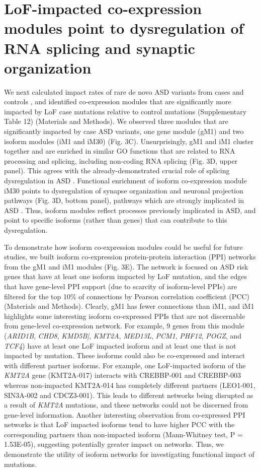 \documentclass[12pt,chapterheads,final]{ucsd}
\begin{document}
\section{LoF-impacted co-expression modules point to dysregulation of RNA splicing and synaptic organization}
We next calculated impact rates of rare de novo ASD variants from cases and controls \cite{Satterstrom2019}, and identified co-expression modules that are significantly more impacted by LoF case mutations relative to control mutations (Supplementary Table 12) (Materials and Methods). We observed three modules that are significantly impacted by case ASD variants, one gene module (gM1) and two isoform modules (iM1 and iM30) (Fig. 3C). Unsurprisingly, gM1 and iM1 cluster together and are enriched in similar GO functions that are related to RNA processing and splicing, including non-coding RNA splicing (Fig. 3D, upper panel). This agrees with the already-demonstrated crucial role of splicing dysregulation in ASD \cite{Parikshak2016,Gandal2018}. Functional enrichment of isoform co-expression module iM30 points to dysregulation of synapse organization and neuronal projection pathways (Fig. 3D, bottom panel), pathways which are strongly implicated in ASD \cite{Pinto2014,Iakoucheva2019}. Thus, isoform modules reflect processes previously implicated in ASD, and point to specific isoforms (rather than genes) that can contribute to this dysregulation. \par
To demonstrate how isoform co-expression modules could be useful for future studies, we built isoform co-expression protein-protein interaction (PPI) networks from the gM1 and iM1 modules (Fig. 3E). The network is focused on ASD risk genes that have at least one isoform impacted by LoF mutation, and the edges that have gene-level PPI support (due to scarcity of isoform-level PPIs) are filtered for the top 10\% of connections by Pearson correlation coefficient (PCC) (Materials and Methods). Clearly, gM1 has fewer connections than iM1, and iM1 highlights some interesting isoform co-expressed PPIs that are not discernable from gene-level co-expression network. For example, 9 genes from this module (\textit{ARID1B}, \textit{CHD8}, \textit{KMD5B|}, \textit{KMT2A}, \textit{MED13L}, \textit{PCM1}, \textit{PHF12}, \textit{POGZ}, and \textit{TCF4}) have at least one LoF impacted isoform and at least one that is not impacted by mutation. These isoforms could also be co-expressed and interact with different partner isoforms. For example, one LoF-impacted isoform of the \textit{KMT2A} gene (KMT2A-017) interacts with CREBBP-001 and CREBBP-003 whereas non-impacted KMT2A-014 has completely different partners (LEO1-001, SIN3A-002 and CDCZ3-001). This leads to different networks being disrupted as a result of \textit{KMT2A} mutations, and these networks could not be discerned from gene-level information. Another interesting observation from co-expressed PPI networks is that LoF impacted isoforms tend to have higher PCC with the corresponding partners than non-impacted isoform (Mann-Whitney test, P = 1.53E-05), suggesting potentially greater impact on networks. Thus, we demonstrate the utility of isoform networks for investigating functional impact of mutations. \par
\end{document}
